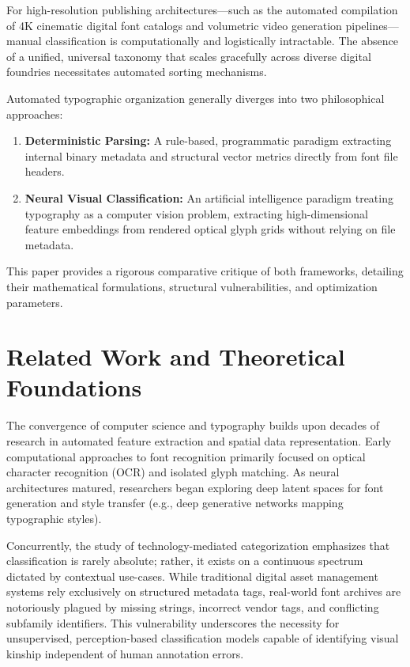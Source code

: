 \documentclass[11pt, onecolumn, a4paper]{article}
\begin{document}
For high-resolution publishing architectures---such as the automated compilation of 4K cinematic digital font catalogs and volumetric video generation pipelines---manual classification is computationally and logistically intractable. The absence of a unified, universal taxonomy that scales gracefully across diverse digital foundries necessitates automated sorting mechanisms.

Automated typographic organization generally diverges into two philosophical approaches:
\begin{enumerate}
    \item \textbf{Deterministic Parsing:} A rule-based, programmatic paradigm extracting internal binary metadata and structural vector metrics directly from font file headers.
    \item \textbf{Neural Visual Classification:} An artificial intelligence paradigm treating typography as a computer vision problem, extracting high-dimensional feature embeddings from rendered optical glyph grids without relying on file metadata.
\end{enumerate}

This paper provides a rigorous comparative critique of both frameworks, detailing their mathematical formulations, structural vulnerabilities, and optimization parameters.

\section{Related Work and Theoretical Foundations}
The convergence of computer science and typography builds upon decades of research in automated feature extraction and spatial data representation. Early computational approaches to font recognition primarily focused on optical character recognition (OCR) and isolated glyph matching. As neural architectures matured, researchers began exploring deep latent spaces for font generation and style transfer (e.g., deep generative networks mapping typographic styles).

Concurrently, the study of technology-mediated categorization emphasizes that classification is rarely absolute; rather, it exists on a continuous spectrum dictated by contextual use-cases. While traditional digital asset management systems rely exclusively on structured metadata tags, real-world font archives are notoriously plagued by missing strings, incorrect vendor tags, and conflicting subfamily identifiers. This vulnerability underscores the necessity for unsupervised, perception-based classification models capable of identifying visual kinship independent of human annotation errors.
\end{document}
